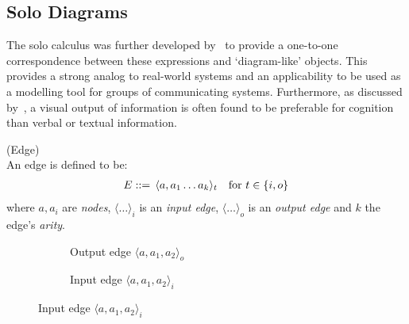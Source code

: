 \subsection{Solo Diagrams}
    The solo calculus was further developed by~\cite{solo-diagrams} to provide a one-to-one correspondence between these  expressions and `diagram-like' objects.
    This provides a strong analog to real-world systems and an applicability to be used as a modelling tool for groups of communicating systems.
    Furthermore, as discussed by~\cite{learning-styles}, a visual output of information is often found to be preferable for cognition than verbal or textual information.


    \begin{definition}{(Edge)\\}
        An edge is defined to be:
        \begin{align}
            E ::= \, \langle a, a_1 \ldots a_k\rangle_t \quad \text{for } t \in \{ i, o \}
        \end{align}
        where $a, a_i$ are \textit{nodes}, $\langle \ldots \rangle_i$ is an \textit{input edge}, $\langle \ldots \rangle_o$ is an \textit{output edge} and $k$ the edge's \textit{arity}.
    \end{definition}

    \begin{figure}[H]
        \centering
        \begin{subfigure}{0.4\linewidth}
            \centering
            \caption*{Output edge $\langle a, a_1, a_2\rangle_o$}
        \end{subfigure}
        \begin{subfigure}{0.4\linewidth}
            \centering
            \caption*{Input edge $\langle a, a_1, a_2\rangle_i$}
        \end{subfigure}
    \end{figure}

